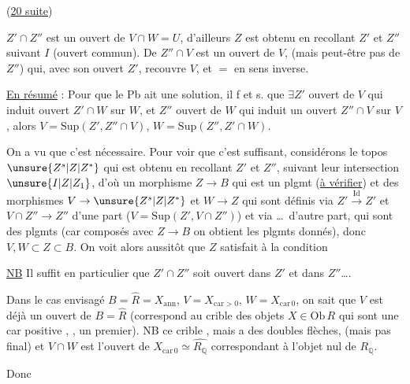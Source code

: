 
(\uline{20 suite})

$Z'\cap Z''$ est un ouvert  de $V\cap W=U$, d'ailleurs $Z$ est obtenu en recollant $Z'$ et $Z''$ suivant $I$ (ouvert commun). De  $Z''\cap V$ est un ouvert de $V$, (mais peut-être pas de $Z''$) qui, avec son ouvert $Z'$, recouvre $V$, et $=$ en sens inverse.


\uline{En résumé} : Pour que le Pb ait une solution, il f et s.  que $\exists Z'$  ouvert de $V$ qui induit  ouvert  $Z'\cap W$ sur $W$, et $Z''$  ouvert de $W$ qui induit un ouvert $Z''\cap V$ sur $V$, alors $V=\mathrm{Sup}(Z',Z''\cap V)$, $W=\mathrm{Sup}(Z'',Z'\cap W)$.

On a vu que c'est nécessaire. Pour voir que c'est suffisant, considérons le topos $\unsure{Z^s|Z|Z^*}$ qui est obtenu en recollant $Z'$ et $Z''$, suivant leur intersection $\unsure{I|Z|Z_1}$, d'où un morphisme $Z\to B$ qui est un plgmt (\uline{à vérifier}) et des morphismes $V\to\unsure{Z^s|Z|Z^*}$ et $W\to Z$ qui sont définis via $Z'\xrightarrow{\mathrm{Id}}Z'$ et $V\cap Z''\longrightarrow Z''$  d'une part ($V=\mathrm{Sup}(Z',V\cap Z'')$) et via \ldots\ d'autre part, qui sont des plgmts (car composés avec $Z\to B$ on obtient les plgmts donnés), donc $V,W\subset Z\subset B$. On voit alors aussitôt que $Z$ satisfait à la condition


\uline{NB} Il suffit en particulier que $Z'\cap Z''$ soit ouvert dans $Z'$ et dans $Z''$\ldots.

Dans le cas envisagé $B=\widehat R=X_{\mathrm{ann}}$, $V=X_{\mathrm{car}>0}$, $W=X_{\mathrm{car}\,0}$, on sait que $V$ est déjà un ouvert de $B=\widehat R$ (correspond au crible des objets $X\in\mathrm{Ob}\,R$ qui sont une car positive  , , un premier). NB ce crible  ,  mais a des doubles flèches, (mais pas  final) et $V\cap W$ est l'ouvert de $X_{\mathrm{car}\,0}\simeq\widehat{R_{\mathbb Q}}$ correspondant à  l'objet nul  de $R_{\mathbb Q}$.

Donc 

